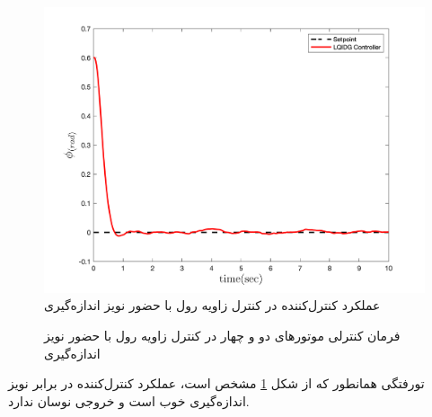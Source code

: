 \begin{figure}[H]
	\includegraphics[width=.48\linewidth]{../Figures/MIL/LQIDG/Roll/lqidg_roll.png}
	\centering
	\caption{عملكرد کنترل‌کننده   در کنترل زاويه رول با حضور نويز اندازه‌گیری}
	\label{lqidg_roll_fig_simulation_n}
\end{figure}
\begin{figure}[H]
	\centering
	\caption{‫‪فرمان کنترلی موتورهای دو و چهار در کنترل زاویه رول با حضور نويز اندازه‌گیری}
\end{figure}
‌تورفتگی همانطور که از شکل
\ref{lqidg_roll_fig_simulation_n}
مشخص است، عملکرد کنترل‌کننده  در برابر نویز اندازه‌گیری خوب است و خروجی نوسان ندارد.